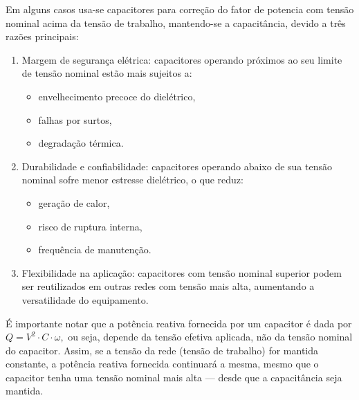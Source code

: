 \documentclass[a4paper]{article}
\begin{document}
Em alguns casos usa-se capacitores para correção do fator de potencia com tensão nominal acima da tensão de trabalho, mantendo-se a capacitância, devido a três razões principais:
\begin{enumerate}
	\item Margem de segurança elétrica: capacitores operando próximos ao seu limite de tensão nominal estão mais sujeitos a:
	\begin{itemize}
		\item envelhecimento precoce do dielétrico,
		\item falhas por surtos,
		\item degradação térmica.
	\end{itemize}
	\item Durabilidade e confiabilidade: capacitores operando abaixo de sua tensão nominal sofre menor estresse dielétrico, o que reduz:
	\begin{itemize}
		\item geração de calor,
		\item risco de ruptura interna,
		\item frequência de manutenção.
	\end{itemize}
	\item Flexibilidade na aplicação: capacitores com tensão nominal superior podem ser reutilizados em outras redes com tensão mais alta, aumentando a versatilidade do equipamento.
\end{enumerate}

É importante notar que a potência reativa fornecida por um capacitor é dada por $Q = V^2 \cdot C \cdot \omega,$ ou seja, depende da tensão efetiva aplicada, não da tensão nominal do capacitor. Assim, se a tensão da rede (tensão de trabalho) for mantida constante, a potência reativa fornecida continuará a mesma, mesmo que o capacitor tenha uma tensão nominal mais alta — desde que a capacitância seja mantida.
  



\printbibliography
\end{document}
